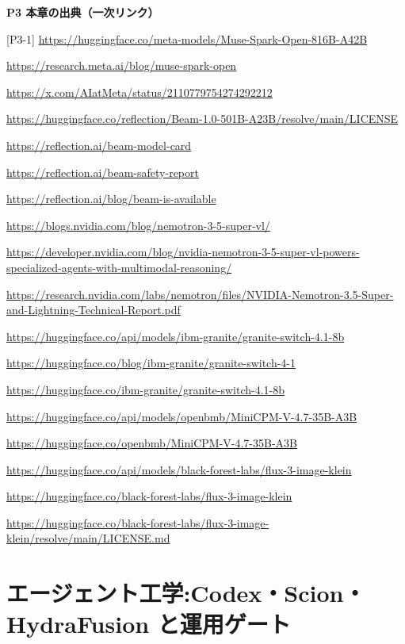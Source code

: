 \documentclass[lualatex,a4paper,10pt]{jlreq}
\begin{document}
\begin{tcolorbox}[colback=white,colframe=SurveyRule,arc=1mm,boxrule=0.4pt,left=2mm,right=2mm]
\textbf{P3 本章の出典（一次リンク）}\par\footnotesize
[P3-1] \url{https://huggingface.co/meta-models/Muse-Spark-Open-816B-A42B}\par
[P3-2] \url{https://research.meta.ai/blog/muse-spark-open}\par
[P3-3] \url{https://x.com/AIatMeta/status/2110779754274292212}\par
[P3-4] \url{https://huggingface.co/reflection/Beam-1.0-501B-A23B/resolve/main/LICENSE}\par
[P3-5] \url{https://reflection.ai/beam-model-card}\par
[P3-6] \url{https://reflection.ai/beam-safety-report}\par
[P3-7] \url{https://reflection.ai/blog/beam-is-available}\par
[P3-8] \url{https://blogs.nvidia.com/blog/nemotron-3-5-super-vl/}\par
[P3-9] \url{https://developer.nvidia.com/blog/nvidia-nemotron-3-5-super-vl-powers-specialized-agents-with-multimodal-reasoning/}\par
[P3-10] \url{https://research.nvidia.com/labs/nemotron/files/NVIDIA-Nemotron-3.5-Super-and-Lightning-Technical-Report.pdf}\par
[P3-11] \url{https://huggingface.co/api/models/ibm-granite/granite-switch-4.1-8b}\par
[P3-12] \url{https://huggingface.co/blog/ibm-granite/granite-switch-4-1}\par
[P3-13] \url{https://huggingface.co/ibm-granite/granite-switch-4.1-8b}\par
[P3-14] \url{https://huggingface.co/api/models/openbmb/MiniCPM-V-4.7-35B-A3B}\par
[P3-15] \url{https://huggingface.co/openbmb/MiniCPM-V-4.7-35B-A3B}\par
[P3-16] \url{https://huggingface.co/api/models/black-forest-labs/flux-3-image-klein}\par
[P3-17] \url{https://huggingface.co/black-forest-labs/flux-3-image-klein}\par
[P3-18] \url{https://huggingface.co/black-forest-labs/flux-3-image-klein/resolve/main/LICENSE.md}\par
\end{tcolorbox}

\section{エージェント工学:Codex・Scion・HydraFusion と運用ゲート}
\label{sec:P4}
\end{document}
